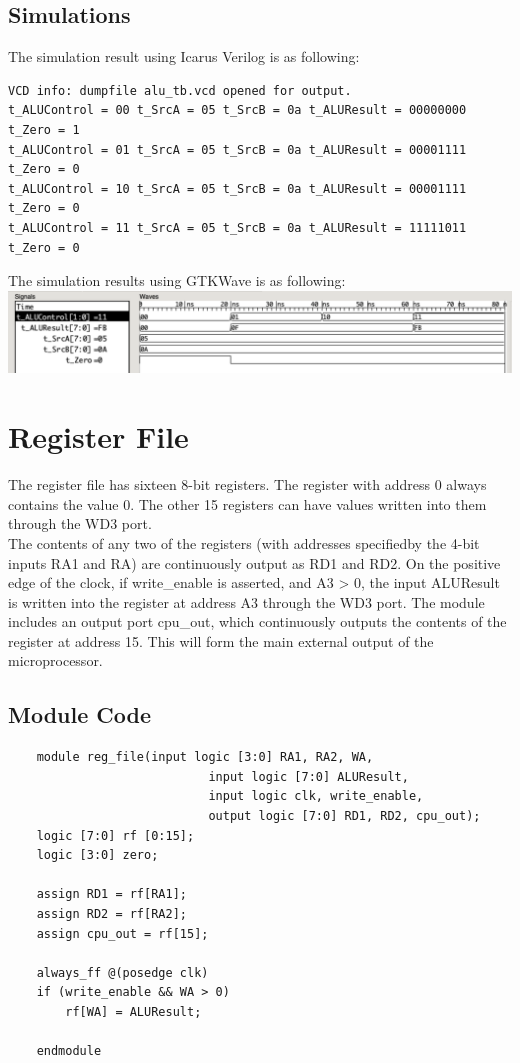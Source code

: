 \documentclass{article}
\begin{document}
\subsection{Simulations}
The simulation result using Icarus Verilog is as following:
\begin{Verbatim}
VCD info: dumpfile alu_tb.vcd opened for output.
t_ALUControl = 00 t_SrcA = 05 t_SrcB = 0a t_ALUResult = 00000000 t_Zero = 1
t_ALUControl = 01 t_SrcA = 05 t_SrcB = 0a t_ALUResult = 00001111 t_Zero = 0
t_ALUControl = 10 t_SrcA = 05 t_SrcB = 0a t_ALUResult = 00001111 t_Zero = 0
t_ALUControl = 11 t_SrcA = 05 t_SrcB = 0a t_ALUResult = 11111011 t_Zero = 0
\end{Verbatim}
The simulation results using GTKWave is as following:\vspace{5pt}\\
\includegraphics[width=\textwidth]{alu.png}

\newpage
\section{Register File}
The register file has sixteen 8-bit registers. The register with address 0 always contains the value 0. The other 15 registers can have values written into them through the WD3 port.\\
The contents of any two of the registers (with addresses specifiedby the 4-bit inputs RA1 and RA) are continuously output as RD1 and RD2. On the positive edge of the clock, if write\_enable is asserted, and A3 > 0, the input ALUResult is written into the register at address A3 through the WD3 port. The module includes an output port cpu\_out, which continuously outputs the contents of the register at address 15. This will form the main external output of the microprocessor.
\subsection{Module Code}
\begin{lstlisting}
    module reg_file(input logic [3:0] RA1, RA2, WA, 
                            input logic [7:0] ALUResult,
                            input logic clk, write_enable,
                            output logic [7:0] RD1, RD2, cpu_out); 
    logic [7:0] rf [0:15];
    logic [3:0] zero;

    assign RD1 = rf[RA1]; 
    assign RD2 = rf[RA2]; 
    assign cpu_out = rf[15];

    always_ff @(posedge clk) 
    if (write_enable && WA > 0) 
        rf[WA] = ALUResult;

    endmodule
\end{lstlisting}
\end{document}
